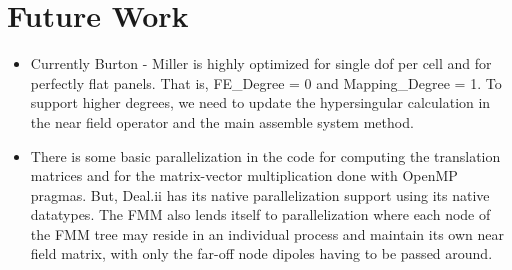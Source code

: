 \chapter{Future Work}\label{chapter:future-work}

\begin{itemize}
    \item Currently Burton - Miller is highly optimized for single dof per cell and for perfectly flat panels. That is, FE\_Degree = 0 and Mapping\_Degree = 1. To support higher degrees, we need to update the hypersingular calculation in the near field operator and the main assemble system method.
    \item There is some basic parallelization in the code for computing the translation matrices and for the matrix-vector multiplication done with OpenMP pragmas. But, Deal.ii has its native parallelization support using its native datatypes. The FMM also lends itself to parallelization where each node of the FMM tree may reside in an individual process and maintain its own near field matrix, with only the far-off node dipoles having to be passed around.
\end{itemize}